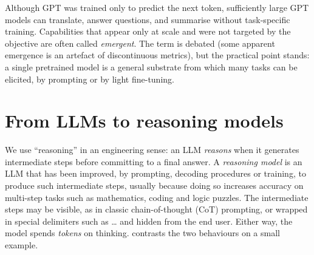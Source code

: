 Although GPT was trained only to predict the next token, sufficiently large GPT models can translate,
answer questions, and summarise without task-specific training. Capabilities that appear only at scale
and were not targeted by the objective are often called \emph{emergent}. The term is debated (some
apparent emergence is an artefact of discontinuous metrics), but the practical point stands: a single
pretrained model is a general substrate from which many tasks can be elicited, by prompting or by light
fine-tuning.

\section{From LLMs to reasoning models}\label{sec:landscape:reasoning}

We use ``reasoning'' in an engineering sense: an LLM \emph{reasons} when it generates intermediate steps
before committing to a final answer. A \emph{reasoning model} is an LLM that has been improved, by
prompting, decoding procedures or training, to produce such intermediate steps, usually because doing
so increases accuracy on multi-step tasks such as mathematics, coding and logic puzzles. The intermediate
steps may be visible, as in classic chain-of-thought (CoT) prompting, or wrapped in special delimiters
such as \ldots{} and hidden from the end user. Either way, the model spends
\emph{tokens} on thinking.  contrasts the two behaviours on a small example.

